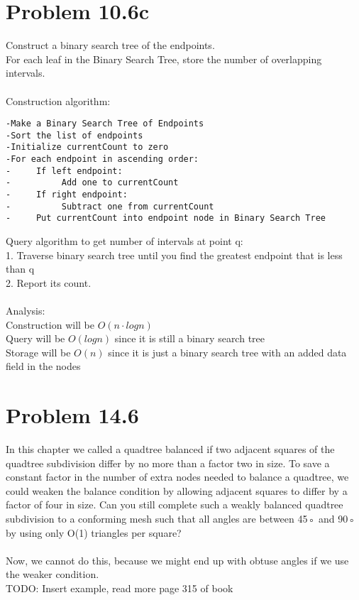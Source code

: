 \documentclass[11pt,psfig]{article}
\begin{document}
\section*{Problem 10.6c}
Construct a binary search tree of the endpoints. \\
For each leaf in the Binary Search Tree, store the number of overlapping intervals. \\
\\
Construction algorithm:
\begin{verbatim}
-Make a Binary Search Tree of Endpoints
-Sort the list of endpoints
-Initialize currentCount to zero
-For each endpoint in ascending order:
-     If left endpoint:
-          Add one to currentCount
-     If right endpoint:
-          Subtract one from currentCount
-     Put currentCount into endpoint node in Binary Search Tree
\end{verbatim}
Query algorithm to get number of intervals at point q:\\
1. Traverse binary search tree until you find the greatest endpoint that is less than q\\
2. Report its count. \\
\\
Analysis:\\
Construction will be $O(n \cdot logn)$ \\
Query will be $O(logn)$ since it is still a binary search tree \\
Storage will be $O(n)$ since it is just a binary search tree with an added data field in the nodes
\newpage
\section*{Problem 14.6}

In this chapter we called a quadtree balanced if two adjacent squares of
the quadtree subdivision differ by no more than a factor two in size. To
save a constant factor in the number of extra nodes needed to balance a
quadtree, we could weaken the balance condition by allowing adjacent
squares to differ by a factor of four in size. Can you still complete such
a weakly balanced quadtree subdivision to a conforming mesh such that
all angles are between 45◦ and 90◦ by using only O(1) triangles per
square?\\
\\
Now, we cannot do this, because we might end up with obtuse angles if we use the weaker condition. \\
TODO: Insert example, read more page 315 of book
\end{document}
